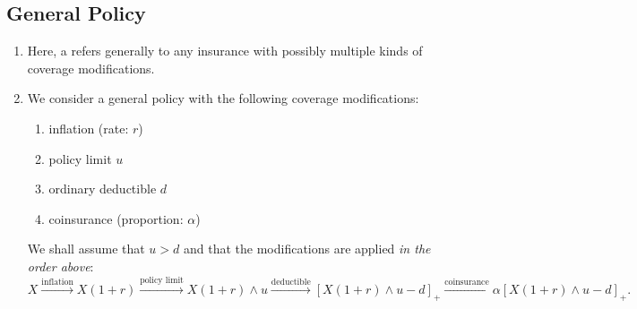 \subsection{General Policy}
\begin{enumerate}
\item Here, a  refers generally to any insurance with
possibly multiple kinds of coverage modifications.

\item We consider a general policy with the following coverage
modifications:
\begin{enumerate}
\item inflation (rate: \(r\))
\item policy limit \(u\)
\item ordinary deductible \(d\)
\item coinsurance (proportion: \(\alpha\))
\end{enumerate}
We shall assume that \(u>d\) and that the modifications are applied \emph{in
the order above}:
\[
X\overset{\text{inflation}}{\to} X(1+r)
\overset{\text{policy limit}}{\to} X(1+r)\wedge u
\overset{\text{deductible}}{\to}[X(1+r)\wedge u-d]_{+}
\overset{\text{coinsurance}}{\to}\alpha[X(1+r)\wedge u-d]_{+}.
\]


\end{enumerate}
